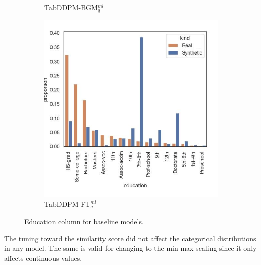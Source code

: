 \begin{figure}[h]
\begin{subfigure}{0.23\textwidth}
		\caption{TabDDPM-BGM$^{ml}_q$}
	\end{subfigure}
	\begin{subfigure}{0.23\textwidth}
		\centering
		\includegraphics[width=\textwidth]{images/dist_education/tab-ddpm-ft.jpg}
		\caption{TabDDPM-FT$^{ml}_q$}
	\end{subfigure}
	\caption{Education column for baseline models.}
	\label{fig:education}
\end{figure}

The tuning toward the similarity score did not affect the categorical distributions in any model.
The same is valid for changing to the min-max scaling since it only affects continuous values.


